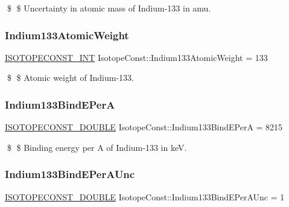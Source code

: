 \$ \$ Uncertainty in atomic mass of Indium-\/133 in amu. \mbox{\label{group___isotope_const-_indium-_in133_ga2a7205fd1804bb27f2871c3a2e7b786c}} 
\subsubsection{\texorpdfstring{Indium133\+Atomic\+Weight}{Indium133AtomicWeight}}
{\footnotesize\ttfamily \mbox{\hyperlink{group___isotope_const-_macros_ga5f18360b3e99483a35c32d789e62621c}{I\+S\+O\+T\+O\+P\+E\+C\+O\+N\+S\+T\+\_\+\+I\+NT}} Isotope\+Const\+::\+Indium133\+Atomic\+Weight = 133}

\$ \$ Atomic weight of Indium-\/133. \mbox{\label{group___isotope_const-_indium-_in133_ga80eb10dd91c7c9d144cd6440b5c0d592}} 
\subsubsection{\texorpdfstring{Indium133\+Bind\+E\+PerA}{Indium133BindEPerA}}
{\footnotesize\ttfamily \mbox{\hyperlink{group___isotope_const-_macros_ga8f45a7272ce02c0b4c65c44636ed719a}{I\+S\+O\+T\+O\+P\+E\+C\+O\+N\+S\+T\+\_\+\+D\+O\+U\+B\+LE}} Isotope\+Const\+::\+Indium133\+Bind\+E\+PerA = 8215}

\$ \$ Binding energy per A of Indium-\/133 in keV. \mbox{\label{group___isotope_const-_indium-_in133_ga5f1d9b6e777b4fd7cfb79162f53685bc}} 
\subsubsection{\texorpdfstring{Indium133\+Bind\+E\+Per\+A\+Unc}{Indium133BindEPerAUnc}}
{\footnotesize\ttfamily \mbox{\hyperlink{group___isotope_const-_macros_ga8f45a7272ce02c0b4c65c44636ed719a}{I\+S\+O\+T\+O\+P\+E\+C\+O\+N\+S\+T\+\_\+\+D\+O\+U\+B\+LE}} Isotope\+Const\+::\+Indium133\+Bind\+E\+Per\+A\+Unc = 1}

